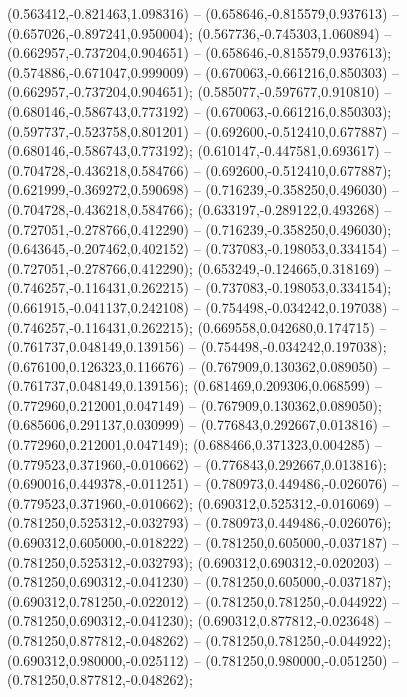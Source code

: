  (0.563412,-0.821463,1.098316) -- (0.658646,-0.815579,0.937613) -- (0.657026,-0.897241,0.950004);
 (0.567736,-0.745303,1.060894) -- (0.662957,-0.737204,0.904651) -- (0.658646,-0.815579,0.937613);
 (0.574886,-0.671047,0.999009) -- (0.670063,-0.661216,0.850303) -- (0.662957,-0.737204,0.904651);
 (0.585077,-0.597677,0.910810) -- (0.680146,-0.586743,0.773192) -- (0.670063,-0.661216,0.850303);
 (0.597737,-0.523758,0.801201) -- (0.692600,-0.512410,0.677887) -- (0.680146,-0.586743,0.773192);
 (0.610147,-0.447581,0.693617) -- (0.704728,-0.436218,0.584766) -- (0.692600,-0.512410,0.677887);
 (0.621999,-0.369272,0.590698) -- (0.716239,-0.358250,0.496030) -- (0.704728,-0.436218,0.584766);
 (0.633197,-0.289122,0.493268) -- (0.727051,-0.278766,0.412290) -- (0.716239,-0.358250,0.496030);
 (0.643645,-0.207462,0.402152) -- (0.737083,-0.198053,0.334154) -- (0.727051,-0.278766,0.412290);
 (0.653249,-0.124665,0.318169) -- (0.746257,-0.116431,0.262215) -- (0.737083,-0.198053,0.334154);
 (0.661915,-0.041137,0.242108) -- (0.754498,-0.034242,0.197038) -- (0.746257,-0.116431,0.262215);
 (0.669558,0.042680,0.174715) -- (0.761737,0.048149,0.139156) -- (0.754498,-0.034242,0.197038);
 (0.676100,0.126323,0.116676) -- (0.767909,0.130362,0.089050) -- (0.761737,0.048149,0.139156);
 (0.681469,0.209306,0.068599) -- (0.772960,0.212001,0.047149) -- (0.767909,0.130362,0.089050);
 (0.685606,0.291137,0.030999) -- (0.776843,0.292667,0.013816) -- (0.772960,0.212001,0.047149);
 (0.688466,0.371323,0.004285) -- (0.779523,0.371960,-0.010662) -- (0.776843,0.292667,0.013816);
 (0.690016,0.449378,-0.011251) -- (0.780973,0.449486,-0.026076) -- (0.779523,0.371960,-0.010662);
 (0.690312,0.525312,-0.016069) -- (0.781250,0.525312,-0.032793) -- (0.780973,0.449486,-0.026076);
 (0.690312,0.605000,-0.018222) -- (0.781250,0.605000,-0.037187) -- (0.781250,0.525312,-0.032793);
 (0.690312,0.690312,-0.020203) -- (0.781250,0.690312,-0.041230) -- (0.781250,0.605000,-0.037187);
 (0.690312,0.781250,-0.022012) -- (0.781250,0.781250,-0.044922) -- (0.781250,0.690312,-0.041230);
 (0.690312,0.877812,-0.023648) -- (0.781250,0.877812,-0.048262) -- (0.781250,0.781250,-0.044922);
 (0.690312,0.980000,-0.025112) -- (0.781250,0.980000,-0.051250) -- (0.781250,0.877812,-0.048262);

